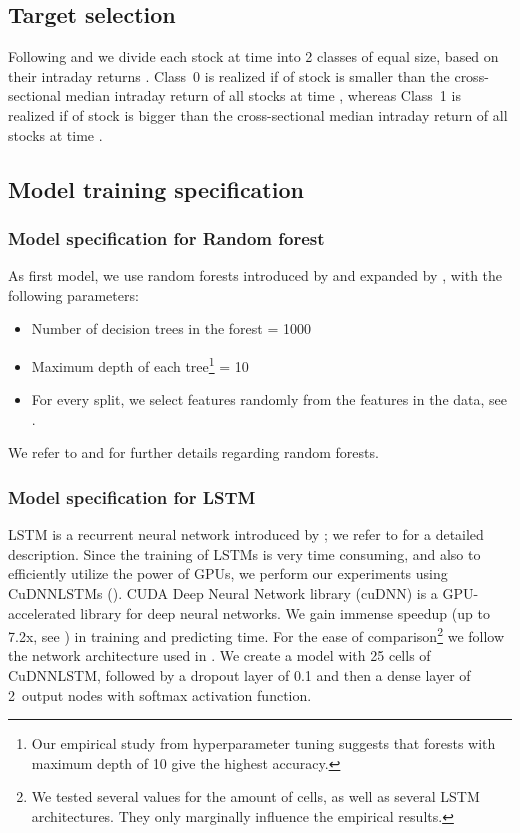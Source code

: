 \documentclass[review]{elsarticle}
\begin{document}
\subsection{Target selection}
\label{subsec:target}
Following \cite{takeuchi2013} and \cite{krauss18} we divide  each 
stock at time   into 2 classes of equal size, based on their intraday returns . Class~0 is realized if  of stock  is smaller than the cross-sectional median intraday return of all stocks at time , whereas  Class~1 is realized if  of stock  is bigger than the cross-sectional median intraday return of all stocks at time .



\subsection{Model training specification}
\subsubsection{Model specification for Random forest}
As first model, we use random forests introduced by \cite{ho1995random} and expanded by \cite{breiman2001random},
with the following parameters: \begin{itemize}
	\item Number of decision trees in the forest = 1000 
	
	\item Maximum depth of each tree\footnote{Our empirical study from hyperparameter tuning suggests that forests with maximum depth of 10 give the highest accuracy.} = 10


	\item For every split, we select  features randomly from the  features in the data, see \cite{pedregosa2011scikit}. 
	
\end{itemize}
We refer to \cite[Subsection~4.3.3]{krauss17} and \cite[Subsection~3.4]{krauss18} for further details regarding random forests.
\subsubsection{Model specification for LSTM} LSTM is a recurrent neural network introduced by \cite{schmidhuber1997long}; we refer to \cite{krauss18} for a detailed description. Since  the training of LSTMs is very time consuming, and also to efficiently utilize the power of GPUs, we perform our experiments using CuDNNLSTMs (\cite{chetlur2014cudnn}). CUDA Deep Neural Network library (cuDNN) is a GPU-accelerated library for deep neural networks. We gain immense speedup (up to 7.2x, see \cite{braun2018lstm}) in training and predicting time. 
For the ease of comparison\footnote{We tested several values  for the amount of cells,
	as well as several LSTM architectures.
They only marginally influence the empirical results.} we follow the network architecture used in \cite{krauss18}. We create a model with 25 cells 
of CuDNNLSTM, followed by a dropout layer of 0.1 and then a dense layer of 2~output nodes with softmax activation function. 
\end{document}
